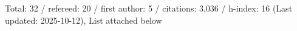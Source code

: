 Total: 32 / refereed: 20 / first author: 5 / citations: 3,036 / h-index: 16 (Last updated: 2025-10-12), List attached below